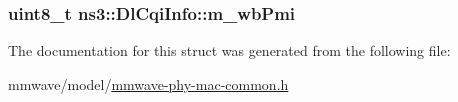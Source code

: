 \subsubsection[{\texorpdfstring{m\+\_\+wb\+Pmi}{m_wbPmi}}]{\setlength{\rightskip}{0pt plus 5cm}uint8\+\_\+t ns3\+::\+Dl\+Cqi\+Info\+::m\+\_\+wb\+Pmi}\hypertarget{structns3_1_1DlCqiInfo_a9e50e887fb7b608f1fe07da411e2340c}{}\label{structns3_1_1DlCqiInfo_a9e50e887fb7b608f1fe07da411e2340c}


The documentation for this struct was generated from the following file\+:\begin{DoxyCompactItemize}
\item 
mmwave/model/\hyperlink{mmwave-phy-mac-common_8h}{mmwave-\/phy-\/mac-\/common.\+h}\end{DoxyCompactItemize}
